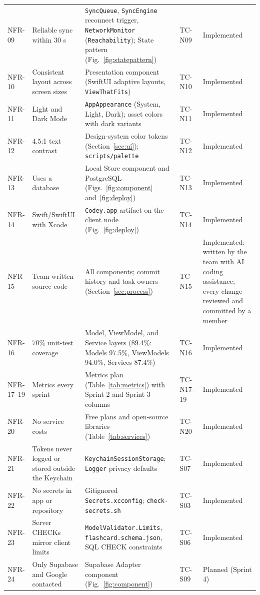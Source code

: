 \documentclass[12pt,letterpaper]{article}
\begin{document}
\begin{xltabular}{\textwidth}{@{}l L{3.2cm} Y l L{2.6cm}@{}}
NFR-09 & Reliable sync within 30 s & \texttt{SyncQueue}, \texttt{SyncEngine} reconnect trigger, \texttt{NetworkMonitor} (\texttt{Reachability}); State pattern (Fig.~\ref{fig:statepattern}) & TC-N09 & Implemented \\
NFR-10 & Consistent layout across screen sizes & Presentation component (SwiftUI adaptive layouts, \texttt{ViewThatFits}) & TC-N10 & Implemented \\
NFR-11 & Light and Dark Mode & \texttt{AppAppearance} (System, Light, Dark); asset colors with dark variants & TC-N11 & Implemented \\
NFR-12 & 4.5:1 text contrast & Design-system color tokens (Section~\ref{sec:ui}); \texttt{scripts/palette} & TC-N12 & Implemented \\
NFR-13 & Uses a database & Local Store component and PostgreSQL (Figs.~\ref{fig:component} and~\ref{fig:deploy}) & TC-N13 & Implemented \\
NFR-14 & Swift/SwiftUI with Xcode & \texttt{Codey.app} artifact on the client node (Fig.~\ref{fig:deploy}) & TC-N14 & Implemented \\
NFR-15 & Team-written source code & All components; commit history and task owners (Section~\ref{sec:process}) & TC-N15 & Implemented: written by the team with AI coding assistance; every change reviewed and committed by a member \\
NFR-16 & 70\% unit-test coverage & Model, ViewModel, and Service layers (89.4\%: Models 97.5\%, ViewModels 94.0\%, Services 87.4\%) & TC-N16 & Implemented \\
NFR-17--19 & Metrics every sprint & Metrics plan (Table~\ref{tab:metrics}) with Sprint 2 and Sprint 3 columns & TC-N17--19 & Implemented \\
NFR-20 & No service costs & Free plans and open-source libraries (Table~\ref{tab:services}) & TC-N20 & Implemented \\
NFR-21 & Tokens never logged or stored outside the Keychain & \texttt{KeychainSessionStorage}; \texttt{Logger} privacy defaults & TC-S07 & Implemented \\
NFR-22 & No secrets in app or repository & Gitignored \texttt{Secrets.xcconfig}; \texttt{check-secrets.sh} & TC-S03 & Implemented \\
NFR-23 & Server CHECKs mirror client limits & \texttt{ModelValidator.Limits}, \texttt{flashcard.schema.json}, SQL CHECK constraints & TC-S06 & Implemented \\
NFR-24 & Only Supabase and Google contacted & Supabase Adapter component (Fig.~\ref{fig:component}) & TC-S09 & Planned (Sprint 4) \\

\end{xltabular}
\end{document}
